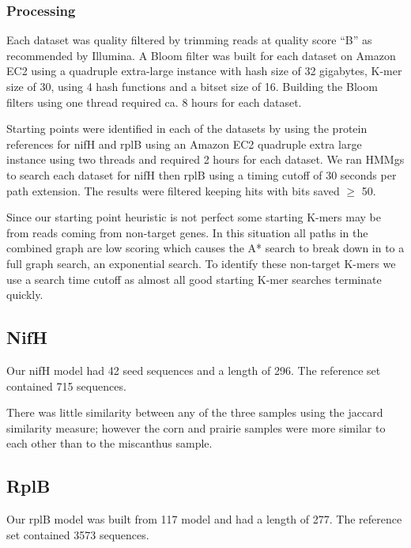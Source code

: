 \documentclass[10pt]{bmc_article}
\newenvironment{bmcformat}{\begin{raggedright}\baselineskip20pt\sloppy\setboolean{publ}{false}}{\end{raggedright}\baselineskip20pt\sloppy}
\begin{document}
\begin{bmcformat}
\subsubsection*{Processing}
Each dataset was quality filtered by trimming reads at quality score “B” as recommended by Illumina\cite{Mann2009}.  A Bloom filter was built for each dataset on Amazon EC2 using a quadruple extra-large instance with hash size of 32 gigabytes, K-mer size of 30, using 4 hash functions and a bitset size of 16. Building the Bloom filters using one thread required ca. 8 hours for each dataset.

Starting points were identified in each of the datasets by using the protein references for nifH and rplB using an Amazon EC2 quadruple extra large instance using two threads and required 2 hours for each dataset. We ran HMMgs to search each dataset for nifH then rplB using a timing cutoff of 30 seconds per path extension. The results were filtered keeping hits with bits saved $\ge$ 50.

Since our starting point heuristic is not perfect some starting K-mers may be from reads coming from non-target genes.  In this situation all paths in the combined graph are low scoring which causes the A* search to break down in to a full graph search, an exponential search.  To identify these non-target K-mers we use a search time cutoff as almost all good starting K-mer searches terminate quickly.

\subsection*{NifH}
Our nifH model had 42 seed sequences and a length of 296.  The reference set contained 715 sequences.

There was little similarity between any of the three samples using the jaccard similarity measure; however the corn and prairie samples were more similar to each other than to the miscanthus sample.

\subsection*{RplB}
Our rplB model was built from 117 model and had a length of 277.  The reference set contained 3573 sequences.
    


\end{bmcformat}
\end{document}
